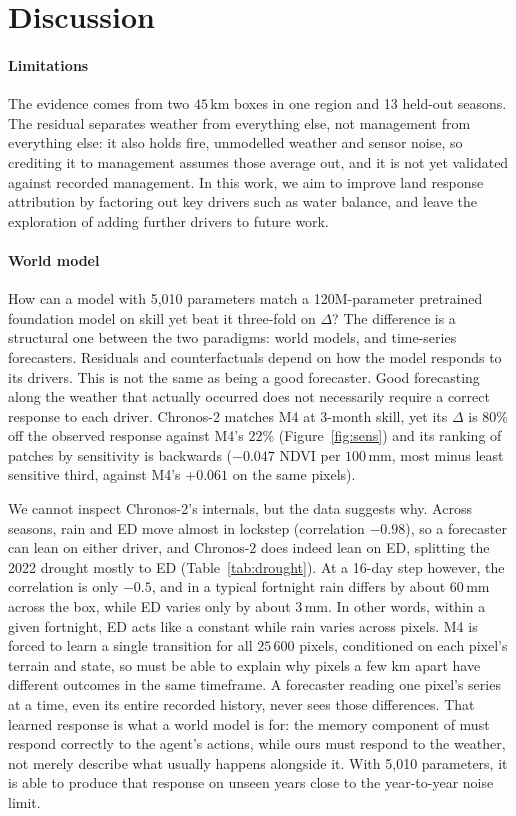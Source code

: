 \documentclass[letterpaper]{article} %
\begin{document}
\section{Discussion}

\paragraph{Limitations} The evidence comes from two $45$\,km boxes in one region and 13 held-out seasons. The residual separates weather from everything else, not management from everything else: it also holds fire, unmodelled weather and sensor noise, so crediting it to management assumes those average out, and it is not yet validated against recorded management. In this work, we aim to improve land response attribution by factoring out key drivers such as water balance, and leave the exploration of adding further drivers to future work.

\paragraph{World model} How can a model with 5,010 parameters match a 120M-parameter pretrained foundation model on skill yet beat it three-fold on $\Delta$? The difference is a structural one between the two paradigms: world models, and time-series forecasters. Residuals and counterfactuals depend on how the model responds to its drivers. This is not the same as being a good forecaster. Good forecasting along the weather that actually occurred does not necessarily require a correct response to each driver. Chronos-2 matches M4 at 3-month skill, yet its $\Delta$ is $80\%$ off the observed response against M4's $22\%$ (Figure~\ref{fig:sens}) and its ranking of patches by sensitivity is backwards ($-0.047$ NDVI per $100$\,mm, most minus least sensitive third, against M4's $+0.061$ on the same pixels).

We cannot inspect Chronos-2's internals, but the data suggests why. Across seasons, rain and ED move almost in lockstep (correlation $-0.98$), so a forecaster can lean on either driver, and Chronos-2 does indeed lean on ED, splitting the 2022 drought mostly to ED (Table~\ref{tab:drought}). At a 16-day step however, the correlation is only $-0.5$, and in a typical fortnight rain differs by about $60$\,mm across the box, while ED varies only by about $3$\,mm. In other words, within a given fortnight, ED acts like a constant while rain varies across pixels. M4 is forced to learn a single transition for all $25\,600$ pixels, conditioned on each pixel's terrain and state, so must be able to explain why pixels a few km apart have different outcomes in the same timeframe. A forecaster reading one pixel's series at a time, even its entire recorded history, never sees those differences. That learned response is what a world model is for: the memory component of \citet{ha2018} must respond correctly to the agent's actions, while ours must respond to the weather, not merely describe what usually happens alongside it. With 5,010 parameters, it is able to produce that response on unseen years close to the year-to-year noise limit. 
\end{document}
